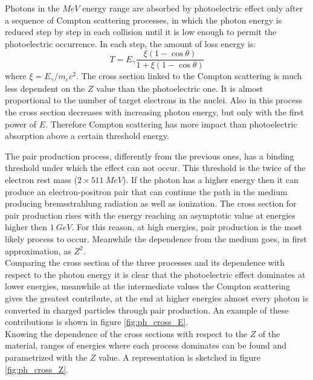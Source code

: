 Photons in the $MeV$ energy range are absorbed by photoelectric effect only after a sequence of Compton scattering processes, in which the photon energy is reduced step by step in each collision until it is low enough to permit the photoelectric occurrence. In each step, the amount of loss energy is:
\begin{equation}
    T = E_{\gamma}\frac{\xi(1 - \cos{\theta})}{1 + \xi(1 - \cos{\theta})}
\end{equation}
where $\xi = E_{\gamma}/m_ec^2$.
The cross section linked to the Compton scattering is much less dependent on the $Z$ value than the photoelectric one. It is almost proportional to the number of target electrons in the nuclei. Also in this process the cross section decreases with increasing photon energy, but only with the first power of $E$. Therefore Compton scattering has more impact than photoelectric absorption above a certain threshold energy. 

The pair production process, differently from the previous ones, has a binding threshold under which the effect can not occur. This threshold is the twice of the electron rest mass ($2\times 511\ MeV$). If the photon has a higher energy then it can produce an electron-positron pair that can continue the path in the medium producing bremsstrahlung radiation as well as ionization.
The cross section for pair production rises with the energy reaching an asymptotic value at energies higher then $1\ GeV$. For this reason, at high energies, pair production is the most likely process to occur. Meanwhile the dependence from the medium goes, in first approximation, as $Z^2$.\\

Comparing the cross section of the three processes and its dependence with respect to the photon energy it is clear that the photoelectric effect dominates at lower energies, meanwhile at the intermediate values the Compton scattering gives the greatest contribute, at the end at higher energies almost every photon is converted in charged particles through pair production. An example of these contributions is shown in figure \ref{fig:ph_cross_E}.\\
Knowing the dependence of the cross sections with respect to the $Z$ of the material, ranges of energies where each process dominates can be found and parametrized with the $Z$ value. A representation is sketched in figure \ref{fig:ph_cross_Z}.


